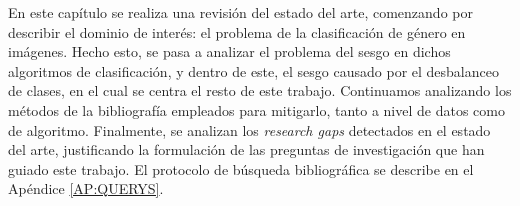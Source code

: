 En este capítulo se realiza una revisión del estado del arte, comenzando por describir el dominio de interés: el problema de la clasificación de género en imágenes. Hecho esto, se pasa a analizar el problema del sesgo en dichos algoritmos de clasificación, y dentro de este, el sesgo causado por el desbalanceo de clases, en el cual se centra el resto de este trabajo. Continuamos analizando los métodos de la bibliografía empleados para mitigarlo, tanto a nivel de datos como de algoritmo. Finalmente, se analizan los \textit{research gaps} detectados en el estado del arte, justificando la formulación de las preguntas de investigación que han guiado este trabajo. %
El protocolo de búsqueda bibliográfica se describe en el Apéndice \ref{AP:QUERYS}.
